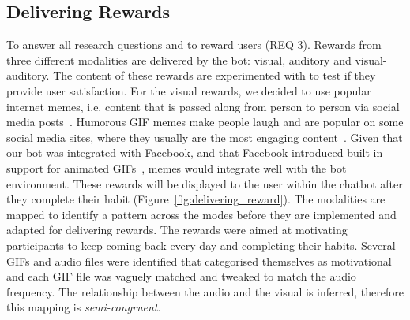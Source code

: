 \subsection*{Delivering Rewards}
To answer all research questions and to reward users (REQ 3). Rewards from three different modalities are delivered by the bot: visual, auditory and visual-auditory. The content of these rewards are experimented with to test if they provide user satisfaction. For the visual rewards, we decided to use popular internet memes, i.e. content that is passed along from person to person via social media posts~\cite{meme_definition}. Humorous GIF memes make people laugh and are popular on some social media sites, where they usually are the most engaging content~\cite{meme_gifs_are_good}. Given that our bot was integrated with Facebook, and that Facebook introduced built-in support for animated GIFs~\cite{fb_gif_rollout}, memes would integrate well with the bot environment. These rewards will be displayed to the user within the chatbot after they complete their habit (Figure~\ref{fig:delivering_reward}). The modalities are mapped to identify a pattern across the modes before they are implemented and adapted for delivering rewards. The rewards were aimed at motivating participants to keep coming back every day and completing their habits. Several GIFs and audio files were identified that categorised themselves as motivational and each GIF file was vaguely matched and tweaked to match the audio frequency. The relationship between the audio and the visual is inferred, therefore this mapping is \textit{semi-congruent}.

